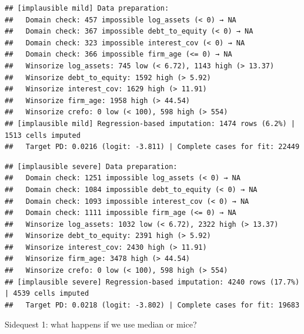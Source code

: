 \documentclass[
]{article}
\newenvironment{Shaded}{\begin{snugshade}}{\end{snugshade}}
\newcommand{\AttributeTok}[1]{\textcolor[rgb]{0.13,0.29,0.53}{#1}}
\newcommand{\CommentTok}[1]{\textcolor[rgb]{0.56,0.35,0.01}{\textit{#1}}}
\newcommand{\FunctionTok}[1]{\textcolor[rgb]{0.13,0.29,0.53}{\textbf{#1}}}
\newcommand{\NormalTok}[1]{#1}
\newcommand{\OtherTok}[1]{\textcolor[rgb]{0.56,0.35,0.01}{#1}}
\newcommand{\SpecialCharTok}[1]{\textcolor[rgb]{0.81,0.36,0.00}{\textbf{#1}}}
\newcommand{\StringTok}[1]{\textcolor[rgb]{0.31,0.60,0.02}{#1}}
\begin{document}
\begin{verbatim}
## [implausible mild] Data preparation:
##   Domain check: 457 impossible log_assets (< 0) → NA
##   Domain check: 367 impossible debt_to_equity (< 0) → NA
##   Domain check: 323 impossible interest_cov (< 0) → NA
##   Domain check: 366 impossible firm_age (<= 0) → NA
##   Winsorize log_assets: 745 low (< 6.72), 1143 high (> 13.37)
##   Winsorize debt_to_equity: 1592 high (> 5.92)
##   Winsorize interest_cov: 1629 high (> 11.91)
##   Winsorize firm_age: 1958 high (> 44.54)
##   Winsorize crefo: 0 low (< 100), 598 high (> 554)
## [implausible mild] Regression-based imputation: 1474 rows (6.2%) | 1513 cells imputed
##   Target PD: 0.0216 (logit: -3.811) | Complete cases for fit: 22449
\end{verbatim}

\begin{Shaded}
\end{Shaded}

\begin{verbatim}
## [implausible severe] Data preparation:
##   Domain check: 1251 impossible log_assets (< 0) → NA
##   Domain check: 1084 impossible debt_to_equity (< 0) → NA
##   Domain check: 1093 impossible interest_cov (< 0) → NA
##   Domain check: 1111 impossible firm_age (<= 0) → NA
##   Winsorize log_assets: 1032 low (< 6.72), 2322 high (> 13.37)
##   Winsorize debt_to_equity: 2391 high (> 5.92)
##   Winsorize interest_cov: 2430 high (> 11.91)
##   Winsorize firm_age: 3478 high (> 44.54)
##   Winsorize crefo: 0 low (< 100), 598 high (> 554)
## [implausible severe] Regression-based imputation: 4240 rows (17.7%) | 4539 cells imputed
##   Target PD: 0.0218 (logit: -3.802) | Complete cases for fit: 19683
\end{verbatim}

Sidequest 1: what happens if we use median or mice?

\begin{Shaded}
\end{Shaded}
\end{document}
